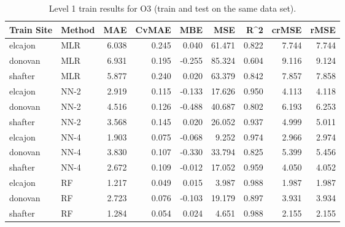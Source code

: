 \begin{table}[h]
\begin{tabular}{llrrrrrrr}
\toprule
 Train Site & Method &   MAE &  CvMAE &       MBE &     MSE &   R\textasciicircum2 &  crMSE &   rMSE \\
\midrule
elcajon & MLR & 6.038 & 0.245 & 0.040 & 61.471 & 0.822 & 7.744 & 7.744\\
donovan & MLR & 6.931 & 0.195 & -0.255 & 85.324 & 0.604 & 9.116 & 9.124\\
shafter & MLR & 5.877 & 0.240 & 0.020 & 63.379 & 0.842 & 7.857 & 7.858\\
elcajon & NN-2 & 2.919 & 0.115 & -0.133 & 17.626 & 0.950 & 4.113 & 4.118\\
donovan & NN-2 & 4.516 & 0.126 & -0.488 & 40.687 & 0.802 & 6.193 & 6.253\\
shafter & NN-2 & 3.568 & 0.145 & 0.020 & 26.052 & 0.937 & 4.999 & 5.011\\
elcajon & NN-4 & 1.903 & 0.075 & -0.068 & 9.252 & 0.974 & 2.966 & 2.974\\
donovan & NN-4 & 3.830 & 0.107 & -0.330 & 33.794 & 0.825 & 5.399 & 5.456\\
shafter & NN-4 & 2.672 & 0.109 & -0.012 & 17.052 & 0.959 & 4.050 & 4.052\\
elcajon & RF & 1.217 & 0.049 & 0.015 & 3.987 & 0.988 & 1.987 & 1.987\\
donovan & RF & 2.723 & 0.076 & -0.103 & 19.179 & 0.897 & 3.931 & 3.934\\
shafter & RF & 1.284 & 0.054 & 0.024 & 4.651 & 0.988 & 2.155 & 2.155\\
\bottomrule
\end{tabular}
\caption{Level 1 train results for O3 (train and test on the same data set).}
\end{table}
